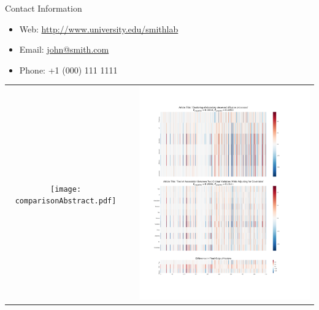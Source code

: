 \documentclass[final]{beamer}
\newlength{\onecolwid}
\begin{document}
\begin{frame}[t]
\begin{columns}[t]
\begin{column}{\onecolwid}
			
			\begin{alertblock}{Contact Information}
				
				\begin{itemize}
					\item Web: \href{http://www.university.edu/smithlab}{http://www.university.edu/smithlab}
					\item Email: \href{mailto:john@smith.com}{john@smith.com}
					\item Phone: +1 (000) 111 1111
				\end{itemize}
				
			\end{alertblock}
			
			\begin{center}
				\begin{tabular}{ccc}
					\texttt{[image: comparisonAbstract.pdf]} & \hfill & \includegraphics[width=0.4\linewidth]{comparisonTitle.pdf}
				\end{tabular}
			\end{center}
			
			
		\end{column} %
		
	\end{columns} %
	
\end{frame} %
\end{document}

